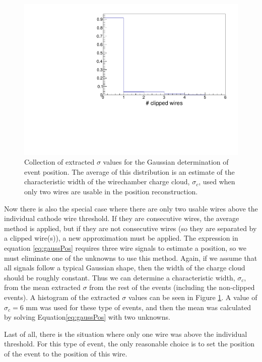 \begin{figure}[h]
  \centering
  \includegraphics[scale=0.5,page=7]{4-UCNACalibrations/mwpc_position.pdf} 
  \caption{Collection of extracted $\sigma$ values for the Gaussian determination of event position. The
    average of this distribution is an estimate of the characteristic width of the wirechamber charge cloud,
    $\sigma_c$, used when only two wires are usable in the position reconstruction.}
  \label{fig:meanSigma}
\end{figure}

Now there is also the special case where there are only two usable wires above the individual cathode
wire threshold. If they are consecutive wires, the average method is applied, but if they are not consecutive wires
(so they are separated by a clipped wire(s)), a new approximation must be applied. The expression in
equation \ref{eq:gaussPos} requires three wire signals to estimate a position, so we must eliminate one of the unknowns
to use this method. Again, if we assume that all signals follow a typical Gaussian shape, then the width of the
charge cloud should be roughly constant. Thus we can determine a characteristic width, $\sigma_c$, from the
mean extracted $\sigma$ from the rest of the events (including the non-clipped events). A histogram of the
extracted $\sigma$ values can be seen in Figure \ref{fig:meanSigma}. A value of $\sigma_c = 6\text{~mm}$ was used
for these type of events, and then the mean was calculated by solving Equation\ref{eq:gaussPos} with two unknowns.

Last of all, there is the situation where only one wire was above the individual threshold. For this type of event,
the only reasonable choice is to set the position of the event to the position of this wire.

